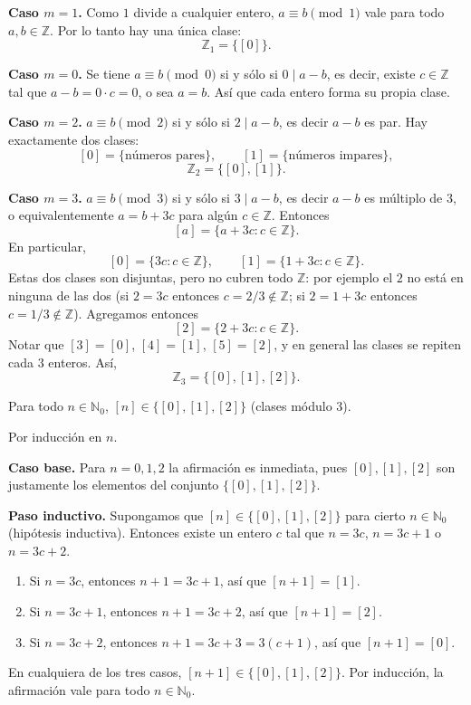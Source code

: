 \begin{ejemplo}
\textbf{Caso $m=1$.} Como $1$ divide a cualquier entero, $a \equiv b
\pmod 1$ vale para todo $a,b \in \mathbb{Z}$. Por lo tanto hay una
única clase:
\[
\mathbb{Z}_1 = \{ [0] \}.
\]

\textbf{Caso $m=0$.} Se tiene $a\equiv b \pmod 0$ si y sólo si
$0 \mid a-b$, es decir, existe $c\in\mathbb{Z}$ tal que $a-b = 0\cdot c
= 0$, o sea $a=b$. Así que cada entero forma su propia clase.

\textbf{Caso $m=2$.} $a \equiv b \pmod 2$ si y sólo si $2 \mid a-b$,
es decir $a-b$ es par. Hay exactamente dos clases:
\[
[0] = \{\text{números pares}\}, \qquad [1] = \{\text{números impares}\},
\]
\[
\mathbb{Z}_2 = \{[0],[1]\}.
\]

\textbf{Caso $m=3$.} $a \equiv b \pmod 3$ si y sólo si $3 \mid a-b$,
es decir $a-b$ es múltiplo de $3$, o equivalentemente $a=b+3c$ para
algún $c\in\mathbb{Z}$. Entonces
\[
[a] = \{ a+3c : c \in \mathbb{Z} \}.
\]
En particular,
\[
[0] = \{3c : c\in\mathbb{Z}\}, \qquad [1] = \{1+3c : c\in\mathbb{Z}\}.
\]
Estas dos clases son disjuntas, pero no cubren todo $\mathbb{Z}$: por
ejemplo el $2$ no está en ninguna de las dos (si $2=3c$ entonces
$c=2/3 \notin \mathbb{Z}$; si $2=1+3c$ entonces $c=1/3\notin
\mathbb{Z}$). Agregamos entonces
\[
[2] = \{2+3c : c\in\mathbb{Z}\}.
\]
Notar que $[3]=[0]$, $[4]=[1]$, $[5]=[2]$, y en general las clases se
repiten cada $3$ enteros. Así,
\[
\mathbb{Z}_3 = \{[0],[1],[2]\}.
\]
\end{ejemplo}

\begin{proposicion}
Para todo $n \in \mathbb{N}_0$, $[n] \in \{[0],[1],[2]\}$ (clases
módulo $3$).
\end{proposicion}

\begin{demostracion}
Por inducción en $n$.

\textbf{Caso base.} Para $n=0,1,2$ la afirmación es inmediata, pues
$[0],[1],[2]$ son justamente los elementos del conjunto
$\{[0],[1],[2]\}$.

\textbf{Paso inductivo.} Supongamos que $[n]\in\{[0],[1],[2]\}$ para
cierto $n\in\mathbb{N}_0$ (hipótesis inductiva). Entonces existe un
entero $c$ tal que $n=3c$, $n=3c+1$ o $n=3c+2$.

\begin{enumerate}
    \item Si $n=3c$, entonces $n+1=3c+1$, así que $[n+1]=[1]$.
    \item Si $n=3c+1$, entonces $n+1=3c+2$, así que $[n+1]=[2]$.
    \item Si $n=3c+2$, entonces $n+1=3c+3=3(c+1)$, así que
    $[n+1]=[0]$.
\end{enumerate}

En cualquiera de los tres casos, $[n+1]\in\{[0],[1],[2]\}$. Por
inducción, la afirmación vale para todo $n\in\mathbb{N}_0$.
\end{demostracion}


